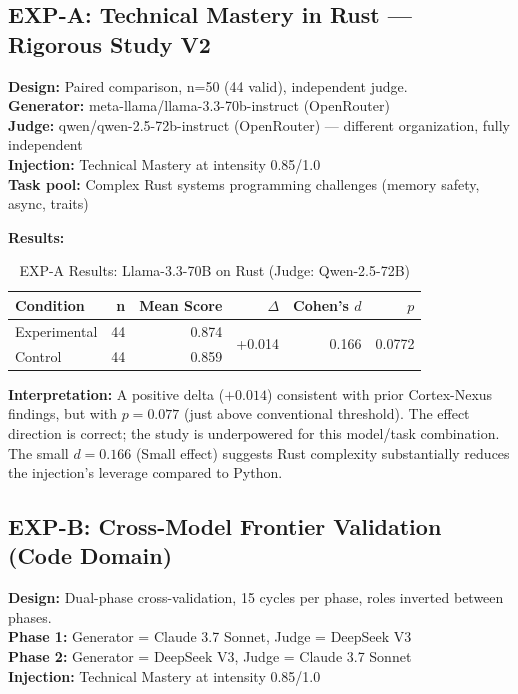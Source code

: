 \documentclass[12pt, a4paper]{article}
\begin{document}
\subsection{EXP-A: Technical Mastery in Rust — Rigorous Study V2}
\textbf{Design:} Paired comparison, n=50 (44 valid), independent judge.\\
\textbf{Generator:} meta-llama/llama-3.3-70b-instruct (OpenRouter)\\
\textbf{Judge:} qwen/qwen-2.5-72b-instruct (OpenRouter) — different organization, fully independent\\
\textbf{Injection:} Technical Mastery at intensity 0.85/1.0\\
\textbf{Task pool:} Complex Rust systems programming challenges (memory safety, async, traits)

\textbf{Results:}
\begin{table}[h]
\centering
\begin{tabular}{lrrrrr}
\toprule
Condition & n & Mean Score & $\Delta$ & Cohen's $d$ & $p$ \\
\midrule
Experimental & 44 & 0.874 & \multirow{2}{*}{+0.014} & \multirow{2}{*}{0.166} & \multirow{2}{*}{0.0772} \\
Control & 44 & 0.859 & & & \\
\bottomrule
\end{tabular}
\caption{EXP-A Results: Llama-3.3-70B on Rust (Judge: Qwen-2.5-72B)}
\end{table}

\textbf{Interpretation:} A positive delta ($+0.014$) consistent with prior Cortex-Nexus findings, but with $p = 0.077$ (just above conventional threshold). The effect direction is correct; the study is underpowered for this model/task combination. The small $d = 0.166$ (Small effect) suggests Rust complexity substantially reduces the injection's leverage compared to Python.

\subsection{EXP-B: Cross-Model Frontier Validation (Code Domain)}
\textbf{Design:} Dual-phase cross-validation, 15 cycles per phase, roles inverted between phases.\\
\textbf{Phase 1:} Generator = Claude 3.7 Sonnet, Judge = DeepSeek V3\\
\textbf{Phase 2:} Generator = DeepSeek V3, Judge = Claude 3.7 Sonnet\\
\textbf{Injection:} Technical Mastery at intensity 0.85/1.0
\end{document}
